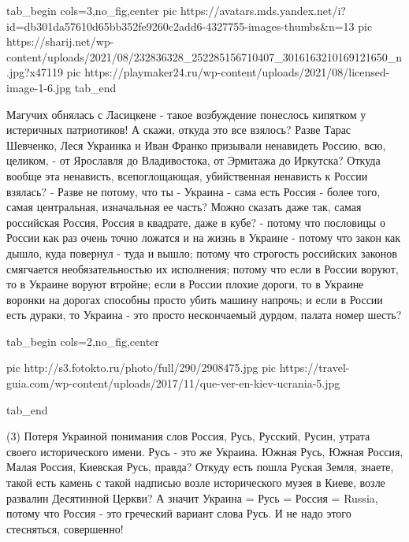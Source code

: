 \ifcmt
  tab_begin cols=3,no_fig,center
     pic https://avatars.mds.yandex.net/i?id=db301da57610d65bb352fe9260c2add6-4327755-images-thumbs&n=13
     pic https://sharij.net/wp-content/uploads/2021/08/232836328_252285156710407_3016163210169121650_n.jpg?x47119
     pic https://playmaker24.ru/wp-content/uploads/2021/08/licensed-image-1-6.jpg
  tab_end
\fi

Магучих обнялась с Ласицкене - такое возбуждение понеслось кипятком у
истеричных патриотиков! А скажи, откуда это все взялось? Разве Тарас Шевченко,
Леся Украинка и Иван Франко призывали ненавидеть Россию, всю, целиком, - от
Ярославля до Владивостока, от Эрмитажа до Иркутска? Откуда вообще эта
ненависть, всепоглощающая, убийственная ненависть к России взялась? - Разве не
потому, что ты - Украина - сама есть Россия - более того, самая центральная,
изначальная ее часть? Можно сказать даже так, самая российская Россия, Россия в
квадрате, даже в кубе? - потому что пословицы о России как раз очень точно
ложатся и на жизнь в Украине - потому что закон как дышло, куда повернул - туда
и вышло; потому что строгость российских законов смягчается необязательностью
их исполнения; потому что если в России воруют, то в Украине воруют втройне;
если в России плохие дороги, то в Украине воронки на дорогах способны просто
убить машину напрочь; и если в России есть дураки, то Украина - это просто
нескончаемый дурдом, палата номер шесть?

\ifcmt
  tab_begin cols=2,no_fig,center

     pic http://s3.fotokto.ru/photo/full/290/2908475.jpg
     pic https://travel-guia.com/wp-content/uploads/2017/11/que-ver-en-kiev-ucrania-5.jpg

  tab_end
\fi

(3) Потеря Украиной понимания слов Россия, Русь, Русский, Русин, утрата своего
исторического имени. Русь - это же Украина. Южная Русь, Южная Россия, Малая
Россия, Киевская Русь, правда?  Откуду есть пошла Руская Земля, знаете, такой
есть камень с такой надписью возле исторического музея в Киеве, возле развалин
Десятинной Церкви?  А значит Украина = Русь = Россия = Russia, потому что
Россия - это греческий вариант слова Русь. И не надо этого стесняться,
совершенно! 

